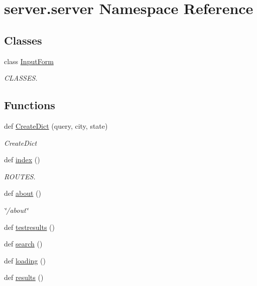 \hypertarget{namespaceserver_1_1server}{}\section{server.\+server Namespace Reference}
\label{namespaceserver_1_1server}
\subsection*{Classes}
\begin{DoxyCompactItemize}
\item 
class \mbox{\hyperlink{classserver_1_1server_1_1_input_form}{Input\+Form}}
\begin{DoxyCompactList}\small\item\em C\+L\+A\+S\+S\+ES. \end{DoxyCompactList}\end{DoxyCompactItemize}
\subsection*{Functions}
\begin{DoxyCompactItemize}
\item 
def \mbox{\hyperlink{namespaceserver_1_1server_a5a8e8748bfecc019464dddba22dec54d}{Create\+Dict}} (query, city, state)
\begin{DoxyCompactList}\small\item\em Create\+Dict \end{DoxyCompactList}\item 
def \mbox{\hyperlink{namespaceserver_1_1server_ab3d96b92729f42de2866e0cb876a0a71}{index}} ()
\begin{DoxyCompactList}\small\item\em R\+O\+U\+T\+ES. \end{DoxyCompactList}\item 
def \mbox{\hyperlink{namespaceserver_1_1server_a7bdc96668852473d18262dd1185ac3d9}{about}} ()
\begin{DoxyCompactList}\small\item\em \char`\"{}/about\char`\"{} \end{DoxyCompactList}\item 
def \mbox{\hyperlink{namespaceserver_1_1server_a955808717557d0ba956fed11f0690c95}{testresults}} ()
\item 
def \mbox{\hyperlink{namespaceserver_1_1server_ae5d697d5408aeb2f94e2aa610a4706aa}{search}} ()
\item 
def \mbox{\hyperlink{namespaceserver_1_1server_a577541b22116afba4cb2125f1597ae79}{loading}} ()
\item 
def \mbox{\hyperlink{namespaceserver_1_1server_a83a8086e94730016efda959e40b9cfaf}{results}} ()
\end{DoxyCompactItemize}
